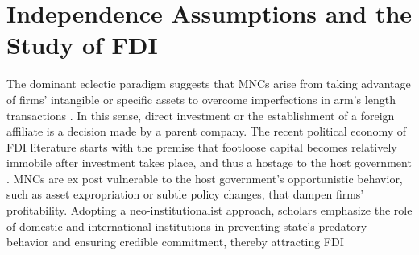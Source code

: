 \documentclass{article}
\begin{document}





\section{Independence Assumptions and the Study of FDI}

The dominant eclectic paradigm suggests that MNCs arise from taking advantage of firms' intangible or specific assets to overcome imperfections in arm's length transactions \citep{Caves:1996,Dunning:1992}. In this sense, direct investment or the establishment of a foreign affiliate is a decision made by a parent company. The recent political economy of FDI literature starts with the premise that footloose capital becomes relatively immobile after investment takes place, and thus a hostage to the host government \citep{Vernon:1971,Vernon:1980}. MNCs are ex post vulnerable to the host government's opportunistic behavior, such as asset expropriation or subtle policy changes, that dampen firms' profitability. Adopting a neo-institutionalist approach, scholars emphasize the role of domestic and international institutions in preventing state's predatory behavior and ensuring credible commitment, thereby attracting FDI \citep[e.g.][]{Henisz:2000,Jensen:2003,Jensen:2006,Li_Resnick:2003,Staats_Biglaiser:2012,Buthe_Milner:2008,Allee_Peinhardt:2011}
\end{document}
